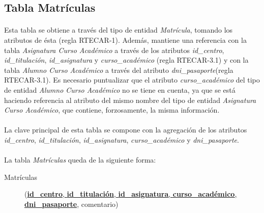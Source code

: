    \subsection{Tabla Matrículas}

      \paragraph{}Esta tabla se obtiene a través del tipo de entidad
      \textit{Matrícula}, tomando los atributos de ésta
      (regla RTECAR-1). Además, mantiene una referencia con la tabla
      \textit{Asignatura Curso Académico} a través de los atributos
      \textit{id\_centro}, \textit{id\_titulación}, \textit{id\_asignatura} y
      \textit{curso\_académico} (regla RTECAR-3.1) y con la tabla
      \textit{Alumno Curso Académico} a través del atributo
      \textit{dni\_pasaporte}(regla RTECAR-3.1). Es necesario puntualizar que el
      atributo \textit{curso\_académico} del tipo de entidad \textit{Alumno Curso
      Académico} no se tiene en cuenta, ya que se está haciendo referencia al
      atributo del mismo nombre del tipo de entidad \textit{Asignatura Curso
      Académico}, que contiene, forzosamente, la misma información.

      \paragraph{}La clave principal de esta tabla se compone con la agregación
      de los atributos \textit{id\_centro}, \textit{id\_titulación},
      \textit{id\_asignatura}, \textit{curso\_académico} y
      \textit{dni\_pasaporte}.

      \paragraph{}La tabla \textit{Matrículas} queda de la
      siguiente forma:

      \begin{description}
         \item[Matrículas] \begin{flushleft}(\underline{\textbf{id\_centro},
         \textbf{id\_titulación}, \textbf{id\_asignatura},
         \textbf{curso\_académico},} \underline{\textbf{dni\_pasaporte}},
         comentario)
         \end{flushleft}
      \end{description}
